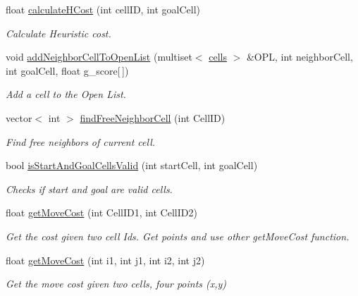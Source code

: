 \begin{DoxyCompactItemize}
float \hyperlink{classRAstar__planner_1_1RAstarPlannerROS_a723d289d6debbf185e8a0e8430a0a4d7}{calculate\-H\-Cost} (int cell\-I\-D, int goal\-Cell)
\begin{DoxyCompactList}\small\item\em Calculate Heuristic cost. \end{DoxyCompactList}\item 
void \hyperlink{classRAstar__planner_1_1RAstarPlannerROS_a16d9f8d214db7aa9c42faade56580b83}{add\-Neighbor\-Cell\-To\-Open\-List} (multiset$<$ \hyperlink{structcells}{cells} $>$ \&O\-P\-L, int neighbor\-Cell, int goal\-Cell, float g\-\_\-score\mbox{[}$\,$\mbox{]})
\begin{DoxyCompactList}\small\item\em Add a cell to the Open List. \end{DoxyCompactList}\item 
vector$<$ int $>$ \hyperlink{classRAstar__planner_1_1RAstarPlannerROS_a1923be37fd592c26b7862a694aaa1cd4}{find\-Free\-Neighbor\-Cell} (int Cell\-I\-D)
\begin{DoxyCompactList}\small\item\em Find free neighbors of current cell. \end{DoxyCompactList}\item 
bool \hyperlink{classRAstar__planner_1_1RAstarPlannerROS_a6c34ac7de619dc756a8598f8e81bfaac}{is\-Start\-And\-Goal\-Cells\-Valid} (int start\-Cell, int goal\-Cell)
\begin{DoxyCompactList}\small\item\em Checks if start and goal are valid cells. \end{DoxyCompactList}\item 
float \hyperlink{classRAstar__planner_1_1RAstarPlannerROS_a2835ea7684c39af99ce0f6acdb6b16ac}{get\-Move\-Cost} (int Cell\-I\-D1, int Cell\-I\-D2)
\begin{DoxyCompactList}\small\item\em Get the cost given two cell Ids. Get points and use other get\-Move\-Cost function. \end{DoxyCompactList}\item 
float \hyperlink{classRAstar__planner_1_1RAstarPlannerROS_adf21053b27e33f30df2dea62f910481c}{get\-Move\-Cost} (int i1, int j1, int i2, int j2)
\begin{DoxyCompactList}\small\item\em Get the move cost given two cells, four points (x,y) \end{DoxyCompactList}\item 

\end{DoxyCompactItemize}
